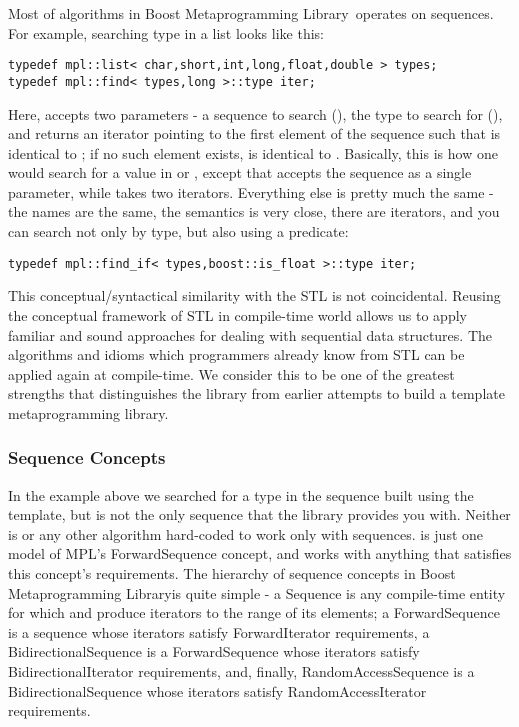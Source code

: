 \documentclass{kapproc}
\newcommand{\Mpl}{Boost Meta\-pro\-gram\-ming Library}
\begin{document}
Most of algorithms in \Mpl\ operates on sequences. For example, 
searching type in a list looks like this:

{\small
\begin{codesamp}\begin{verbatim}
typedef mpl::list< char,short,int,long,float,double > types;
typedef mpl::find< types,long >::type iter;
\end{verbatim}
\end{codesamp}
}

Here,  accepts two parameters - a sequence to search
(), the type to search for (), and returns an
iterator  pointing to the first element of the sequence
such that  is identical to ; if no such
element exists,  is identical to
. Basically, this is how one would search for a
value in  or , except that
 accepts the sequence as a single parameter,
while  takes two iterators.  Everything else is pretty
much the same - the names are the same, the semantics is very close,
there are iterators, and you can search not only by type, but also
using a predicate:

{\small
\begin{codesamp}\begin{verbatim}
typedef mpl::find_if< types,boost::is_float >::type iter;
\end{verbatim}
\end{codesamp}
}

This conceptual/syntactical similarity with the STL is not
coincidental. Reusing the conceptual framework of STL in compile-time
world allows us to apply familiar and sound approaches for dealing
with sequential data structures. The algorithms and idioms which
programmers already know from STL can be applied again at
compile-time. We consider this to be one of the greatest strengths
that distinguishes the library from earlier attempts to build a
template metaprogramming library.

\subsubsection{Sequence Concepts}

In the  example above we searched for a type in the
sequence built using the  template, but
 is not the only sequence that the library provides you
with. Neither is or any other algorithm
hard-coded to work only with  sequences.  is
just one model of MPL's ForwardSequence concept, and  works
with anything that satisfies this concept's requirements. The
hierarchy of sequence concepts in \Mpl is quite simple - a Sequence is
any compile-time entity for which  and 
produce iterators to the range of its elements; a ForwardSequence is a
sequence whose iterators satisfy ForwardIterator requirements, a
BidirectionalSequence is a ForwardSequence whose iterators satisfy
BidirectionalIterator requirements, and, finally, RandomAccessSequence
is a BidirectionalSequence whose iterators satisfy
RandomAccessIterator requirements.
\end{document}
